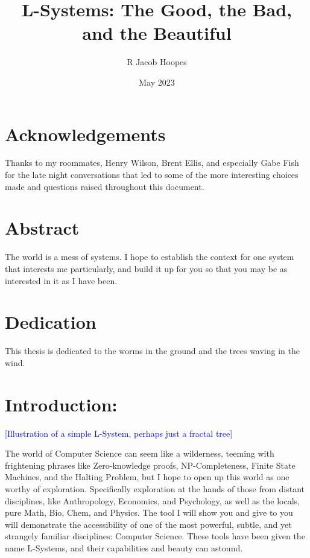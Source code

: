 \documentclass[12pt,twoside]{reedthesis}
\title{L-Systems: The Good, the Bad, and the Beautiful}
\author{R Jacob Hoopes}
\date{May 2023}
\begin{document}
  \maketitle
  \frontmatter %
  \pagestyle{empty} %

    \chapter*{Acknowledgements}
	Thanks to my roommates, Henry Wilson, Brent Ellis, and especially Gabe Fish for the late night conversations that led to some of the more interesting choices made and questions raised throughout this document.


    \tableofcontents

\chapter*{Abstract}
	The world is a mess of systems. I hope to establish the context for one system that interests me particularly, and build it up for you so that you may be as interested in it as I have been.
	
\chapter*{Dedication}
	This thesis is dedicated to the worms in the ground and the trees waving in the wind.

  \mainmatter %
  \pagestyle{fancyplain} %

\chapter*{Introduction: }
	
\textcolor{blue}{[Illustration of a simple L-System, perhaps just a fractal tree]}

The world of Computer Science can seem like a wilderness, teeming with frightening phrases like Zero-knowledge proofs, NP-Completeness, Finite State Machines, and the Halting Problem, but I hope to open up this world as one worthy of exploration. Specifically exploration at the hands of those from distant disciplines, like Anthropology, Economics, and Psychology, as well as the locals, pure Math, Bio, Chem, and Physics. The tool I will show you and give to you will demonstrate the accessibility of one of the most powerful, subtle, and yet strangely familiar disciplines: Computer Science. These tools have been given the name L-Systems, and their capabilities and beauty can astound.
	
\end{document}
